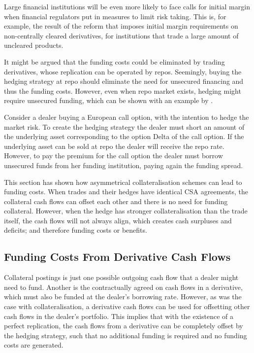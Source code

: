 \documentclass[main.tex]{subfiles}
\begin{document}
        Large financial institutions will be even more likely to face calls for initial margin
        when financial regulators put in measures to limit risk taking.
        This is, for example, the result of the reform \textcite{BCBC2020}
        that imposes initial margin requirements on non-centrally cleared derivatives, 
        for institutions that trade a large amount of uncleared products.

        It might be argued that the funding costs could be eliminated by trading derivatives,
        whose replication can be operated by repos. 
        Seemingly, buying the hedging strategy at repo should eliminate the need for unsecured financing
        and thus the funding costs. 
        However, even when repo market exists, hedging might require unsecured funding,
        which can be shown with an example by \textcite{Castagna2012FVA}.

        \begin{example}
        Consider a dealer buying a European call option, with the intention to hedge the market risk.
        To create the hedging strategy the dealer must short an amount of the underlying asset corresponding to the option Delta of the call option.
        If the underlying asset can be sold at repo the dealer will receive the repo rate.
        However, to pay the premium for the call option the dealer must borrow unsecured funds from her funding institution,
        paying again the funding spread. 
        \end{example}

        This section has shown how asymmetrical collateralisation schemes
        can lead to funding costs. 
        When trades and their hedges have identical CSA agreements, 
        the collateral cash flows can offset each other and there is no need for funding collateral.
        However, when the hedge has stronger collateralisation than the trade itself,
        the cash flows will not always align, which creates cash surpluses and deficits;
        and therefore funding costs or benefits.
        
    \subsection{Funding Costs From Derivative Cash Flows}
        Collateral postings is just one possible outgoing cash flow that a dealer might need to fund.
        Another is the contractually agreed on cash flows in a derivative,
        which must also be funded at the dealer's borrowing rate.
        However, as was the case with collateralisation,
        a derivative cash flows can be used for offsetting 
        other cash flows in the dealer's portfolio.
        This implies that with the existence of a perfect replication,
        the cash flows from a derivative can be completely offset by the hedging strategy,
        such that no additional funding is required and no funding costs are generated.
\end{document}
